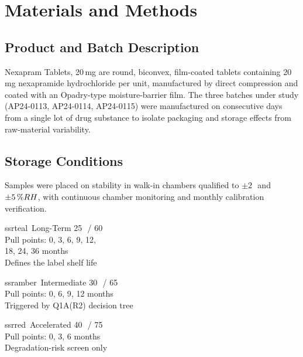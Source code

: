 \section{Materials and Methods}

\subsection{Product and Batch Description}
Nexapram Tablets, 20\,mg are round, biconvex, film-coated tablets containing
20\,mg nexapramide hydrochloride per unit, manufactured by direct compression and
coated with an Opadry-type moisture-barrier film. The three batches under study
(AP24-0113, AP24-0114, AP24-0115) were manufactured on consecutive days from a single
lot of drug substance to isolate packaging and storage effects from raw-material
variability.

\subsection{Storage Conditions}
Samples were placed on stability in walk-in chambers qualified to \(\pm 2\,\)\degC\ and
\(\pm 5\,\%RH\), with continuous chamber monitoring and monthly calibration verification.

\begin{minipage}[t]{0.31\textwidth}
\begin{conditioncard}{ssrteal}{\faThermometerHalf\ Long-Term}
  \small
  25\,\degC\ / 60\,\RH\\
  Pull points: 0, 3, 6, 9, 12,\\ 18, 24, 36 months\\
  Defines the label shelf life
\end{conditioncard}
\end{minipage}\hfill
\begin{minipage}[t]{0.31\textwidth}
\begin{conditioncard}{ssramber}{\faThermometerHalf\ Intermediate}
  \small
  30\,\degC\ / 65\,\RH\\
  Pull points: 0, 6, 9, 12 months\\
  Triggered by Q1A(R2) decision tree
\end{conditioncard}
\end{minipage}\hfill
\begin{minipage}[t]{0.31\textwidth}
\begin{conditioncard}{ssrred}{\faThermometerHalf\ Accelerated}
  \small
  40\,\degC\ / 75\,\RH\\
  Pull points: 0, 3, 6 months\\
  Degradation-risk screen only
\end{conditioncard}
\end{minipage}
\par
\vspace{0.8em}

